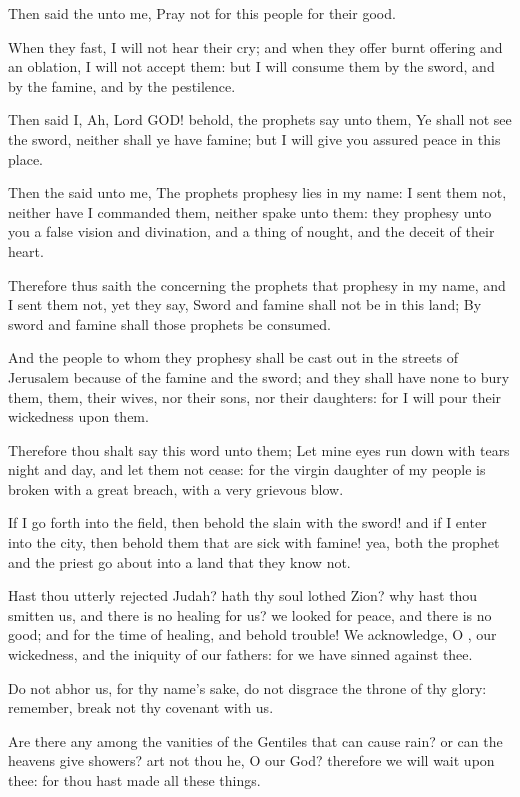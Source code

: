 \verse Then said the \LORD unto me, Pray not for this people for their good.

\verse When they fast, I will not hear their cry; and when they offer burnt offering and an oblation, I will not accept them: but I will consume them by the sword, and by the famine, and by the pestilence.

\verse Then said I, Ah, Lord GOD! behold, the prophets say unto them, Ye shall not see the sword, neither shall ye have famine; but I will give you assured peace in this place.

\verse Then the \LORD said unto me, The prophets prophesy lies in my name: I sent them not, neither have I commanded them, neither spake unto them: they prophesy unto you a false vision and divination, and a thing of nought, and the deceit of their heart.

\verse Therefore thus saith the \LORD concerning the prophets that prophesy in my name, and I sent them not, yet they say, Sword and famine shall not be in this land; By sword and famine shall those prophets be consumed.

\verse And the people to whom they prophesy shall be cast out in the streets of Jerusalem because of the famine and the sword; and they shall have none to bury them, them, their wives, nor their sons, nor their daughters: for I will pour their wickedness upon them.

\verse Therefore thou shalt say this word unto them; Let mine eyes run down with tears night and day, and let them not cease: for the virgin daughter of my people is broken with a great breach, with a very grievous blow.

\verse If I go forth into the field, then behold the slain with the sword!  and if I enter into the city, then behold them that are sick with famine!  yea, both the prophet and the priest go about into a land that they know not.

\verse Hast thou utterly rejected Judah? hath thy soul lothed Zion? why hast thou smitten us, and there is no healing for us? we looked for peace, and there is no good; and for the time of healing, and behold trouble!  \verse We acknowledge, O \LORD, our wickedness, and the iniquity of our fathers: for we have sinned against thee.

\verse Do not abhor us, for thy name's sake, do not disgrace the throne of thy glory: remember, break not thy covenant with us.

\verse Are there any among the vanities of the Gentiles that can cause rain? or can the heavens give showers? art not thou he, O \LORD our God?  therefore we will wait upon thee: for thou hast made all these things.


